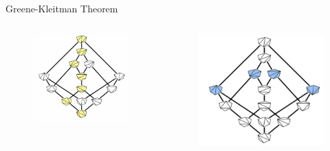 \documentclass[xcolor=x11names,compress,t]{beamer}
\begin{document}
\begin{frame}{Greene-Kleitman Theorem}
    \vspace{-0.9cm}
    \begin{columns}
        \begin{column}{0.5\textwidth}
            \begin{figure}
                \centering
                \includegraphics[scale = 0.25]{ExA.png}
            \end{figure}
        \end{column}
        \begin{column}{0.5\textwidth}
            \begin{figure}
                \centering
                \includegraphics[scale = 0.07]{Antichain_B.PNG}
            \end{figure}
        \end{column}
    \end{columns}
    

\end{frame}
\end{document}
